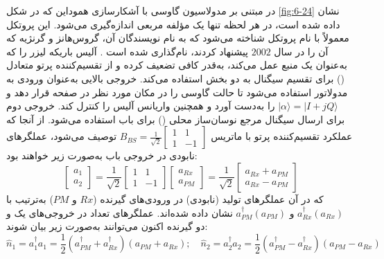 در  مبتنی بر مدولاسیون گاوسی با آشکارسازی هموداین \cite{2, 8} که در شکل \ref{fig:6-24} نشان داده شده است، در هر لحظه تنها یک مؤلفه مربعی اندازه‌گیری می‌شود. این پروتکل معمولاً با نام پروتکل   شناخته می‌شود که به نام نویسندگان آن، گروس‌هانز و گرنژیه که آن را در سال $2002$ پیشنهاد کردند، نام‌گذاری شده است \cite{146}. آلیس باریکه لیزر را که به‌عنوان یک منبع  عمل می‌کند، به‌قدر کافی تضعیف کرده و از تقسیم‌کننده پرتو متعادل () برای تقسیم سیگنال به دو بخش استفاده می‌کند. خروجی بالایی  به‌عنوان ورودی به مدولاتور  استفاده می‌شود تا حالت گاوسی را در مکان مورد نظر در صفحه  قرار دهد و $|\alpha\rangle = |I + jQ\rangle$ را به‌دست آورد و همچنین واریانس آلیس را کنترل کند. خروجی دوم  برای ارسال سیگنال مرجع نوسان‌ساز محلی () برای باب استفاده می‌شود. از آنجا که عملکرد تقسیم‌کننده پرتو با ماتریس $B_{BS} = \frac{1}{\sqrt{2}} \begin{bmatrix} 1 & 1 \\ 1 & -1 \end{bmatrix}$ توصیف می‌شود، عملگرهای نابودی در خروجی  باب به‌صورت زیر خواهند بود:
\begin{equation}
	\begin{bmatrix} a_1 \\ a_2 \end{bmatrix} = \frac{1}{\sqrt{2}} \begin{bmatrix} 1 & 1 \\ 1 & -1 \end{bmatrix} \begin{bmatrix} a_{Rx} \\ a_{PM} \end{bmatrix} = \frac{1}{\sqrt{2}} \begin{bmatrix} a_{Rx} + a_{PM} \\ a_{Rx} - a_{PM} \end{bmatrix}
	\label{eq:6-73}
\end{equation}
که در آن عملگرهای تولید (نابودی) در ورودی‌های  گیرنده ($Rx$ و $PM$) به‌ترتیب با $a_{Rx}^\dagger (a_{Rx})$ و $a_{PM}^\dagger (a_{PM})$ نشان داده شده‌اند. عملگرهای تعداد در خروجی‌های یک و دو  گیرنده اکنون می‌توانند به‌صورت زیر بیان شوند:
\begin{equation}
	\hat{n}_1 = a_1^\dagger a_1 = \frac{1}{2} (a_{PM}^\dagger + a_{Rx}^\dagger)(a_{PM} + a_{Rx}); \quad \hat{n}_2 = a_2^\dagger a_2 = \frac{1}{2} (a_{PM}^\dagger - a_{Rx}^\dagger)(a_{PM} - a_{Rx})
	\label{eq:6-74}
\end{equation}
